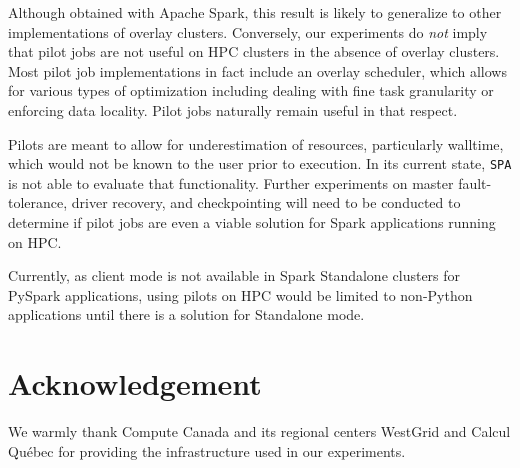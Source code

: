 \documentclass{IEEEtran}
\begin{document}
Although obtained with Apache Spark, this result is likely to generalize to
other implementations of overlay clusters. Conversely, our experiments do
\emph{not} imply that pilot jobs are not useful on HPC clusters in the
absence of overlay clusters. Most pilot job implementations in fact include
an overlay scheduler, which allows for various types of optimization
including dealing with fine task granularity or enforcing data locality.
Pilot jobs naturally remain useful in that respect.

Pilots are meant to allow for underestimation of resources, particularly
walltime, which would not be known to the user prior to execution. In its
current state, \texttt{SPA} is not able to evaluate that functionality.
Further experiments on master fault-tolerance, driver recovery, and
checkpointing will need to be conducted to determine if pilot jobs are even
a viable solution for Spark applications running on HPC.

Currently, as client mode is not available in Spark Standalone clusters for
PySpark applications, using pilots on HPC would be limited to non-Python
applications until there is a solution for Standalone mode.

\section*{Acknowledgement}

We warmly thank Compute Canada and its regional centers WestGrid and Calcul
Qu\'ebec for providing the infrastructure used in our experiments.

 

\end{document}
